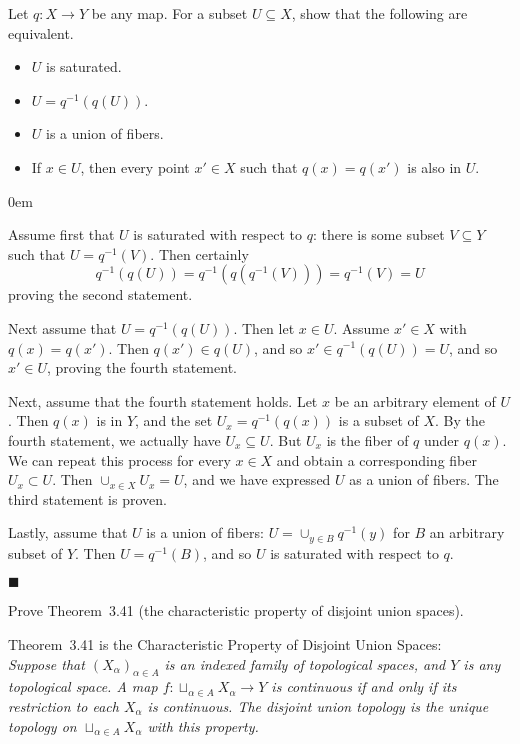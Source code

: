 \documentclass[12pt]{article}
\renewcommand{\qed}{\hfill$\blacksquare$}
\renewenvironment{proof}{\begin{addmargin}[1em]{0em}\begin{newproof}}{\end{newproof}\end{addmargin}\qed}
\newenvironment{problem}[2][Problem]{\begin{trivlist}
\item[\hskip \labelsep {\bfseries #1}\hskip \labelsep {\bfseries #2.}]}{\end{trivlist}}
\newenvironment{exercise}[2][Exercise]{\begin{trivlist}
\item[\hskip \labelsep {\bfseries #1}\hskip \labelsep {\bfseries #2.}]}{\end{trivlist}}
\begin{document}
\begin{exercise}{3.59}
Let $q:X\rightarrow Y$ be any map. For a subset $U\subseteq X$, show that the following are equivalent.
\begin{itemize}
	\item $U$ is saturated.
	\item $U=q^{-1}\left(q\left(U\right)\right)$.
	\item $U$ is a union of fibers.
	\item If $x\in U$, then every point $x' \in X$ such that $q\left(x\right) = q\left(x'\right)$ is also in $U$.
\end{itemize}
\end{exercise}
\begin{proof}
Assume first that $U$ is saturated with respect to $q$: there is some subset $V\subseteq Y$ such that $U=q^{-1}\left(V\right)$. Then certainly $$ q^{-1}\left(q\left(U\right)\right) = q^{-1}\left(q\left(q^{-1}\left(V\right)\right)\right) = q^{-1}\left(V\right) = U $$ proving the second statement.

Next assume that $U=q^{-1}\left(q\left(U\right)\right)$. Then let $x\in U$. Assume $x' \in X$ with $q\left(x\right) = q\left(x'\right)$. Then $q\left(x'\right) \in q\left(U\right)$, and so $x' \in q^{-1}\left(q\left(U\right)\right)=U$, and so $x'\in U$, proving the fourth statement.

Next, assume that the fourth statement holds. Let $x$ be an arbitrary element of $U$. Then $q\left(x\right)$ is in $Y$, and the set $U_x = q^{-1}\left(q\left(x\right)\right) $ is a subset of $X$. By the fourth statement, we actually have $U_x \subseteq U$. But $U_x$ is the fiber of $q$ under $q\left(x\right)$. We can repeat this process for every $x\in X$ and obtain a corresponding fiber $U_x \subset U$. Then $\cup_{x\in X} U_x = U$, and we have expressed $U$ as a union of fibers. The third statement is proven.

Lastly, assume that $U$ is a union of fibers: $U = \cup_{y \in B} q^{-1}\left(y\right)$ for $B$ an arbitrary subset of $Y$. Then $U = q^{-1}\left(B\right)$, and so $U$ is saturated with respect to $q$.

\end{proof}









\begin{problem}{3-10}
Prove Theorem~3.41 (the characteristic property of disjoint union spaces).
\end{problem}
Theorem~3.41 is the Characteristic Property of Disjoint Union Spaces:\\
\textit{Suppose that $\left(X_{\alpha}\right)_{\alpha \in A}$ is an indexed family of topological spaces, and $Y$ is any topological space. A map $f:\sqcup_{\alpha \in A} X_{\alpha}\rightarrow Y$ is continuous if and only if its restriction to each $X_{\alpha}$ is continuous. The disjoint union topology is the unique topology on $\sqcup_{\alpha \in A} X_{\alpha}$ with this property.}\\
\end{document}
